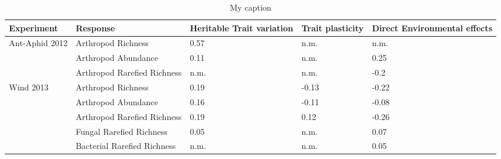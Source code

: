 \begin{table}[]
\centering
\caption{My caption}
\label{}
\begin{tabular}{@{}lllll@{}}
\toprule
Experiment                      & Response                    & Heritable Trait variation & Trait plasticity & Direct Environmental effects \\ \midrule
\multirow{3}{*}{Ant-Aphid 2012} & Arthropod Richness          & 0.57                      & n.m.             & n.m.                         \\
                                & Arthropod Abundance         & 0.11                      & n.m.             & 0.25                         \\
                                & Arthropod Rarefied Richness & n.m.                      & n.m.             & -0.2                         \\
\multirow{5}{*}{Wind 2013}      & Arthropod Richness          & 0.19                      & -0.13            & -0.22                        \\
                                & Arthropod Abundance         & 0.16                      & -0.11            & -0.08                        \\
                                & Arthropod Rarefied Richness & 0.19                      & 0.12             & -0.26                        \\
                                & Fungal Rarefied Richness    & 0.05                      & n.m.             & 0.07                         \\
                                & Bacterial Rarefied Richness & n.m.                      & n.m.             & 0.05                         \\ \cmidrule(l){2-5} 
\end{tabular}
\end{table}